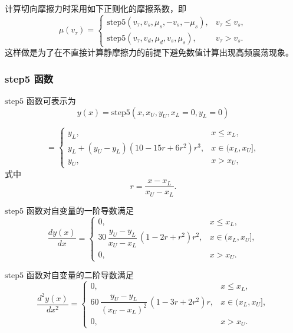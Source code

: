 计算切向摩擦力时采用如下正则化的摩擦系数，即
\begin{equation}\label{eq:11.74}
\mu(v_{\tau}) = \begin{cases}
\mathrm{step5}(v_{\tau}, v_s, \mu_s, -v_s, -\mu_s), & v_{\tau} \leq v_s, \\[4pt]
\mathrm{step5}(v_{\tau}, v_d, \mu_d, v_s, \mu_s), & v_{\tau} > v_s.
\end{cases}
\end{equation}
这样做是为了在不直接计算静摩擦力的前提下避免数值计算出现高频震荡现象。

\subsubsection{step5 函数}

$\mathrm{step5}$ 函数可表示为
\begin{equation}\label{eq:11.75}
y(x) = \mathrm{step5}(x, x_U, y_U, x_L = 0, y_L = 0)
\end{equation}

\begin{equation}\label{eq:11.76}
= \begin{cases}
y_L, & x \leq x_L, \\[6pt]
y_L + (y_U - y_L) (10 - 15r + 6r^2) r^3, & x \in (x_L, x_U], \\[6pt]
y_U, & x > x_U,
\end{cases}
\end{equation}
式中
\begin{equation}\label{eq:11.77}
r = \frac{x - x_L}{x_U - x_L}.
\end{equation}

$\mathrm{step5}$ 函数对自变量的一阶导数满足
\begin{equation}\label{eq:11.78}
\frac{dy(x)}{dx} = \begin{cases}
0, & x \leq x_L, \\[6pt]
30 \, \dfrac{y_U - y_L}{x_U - x_L} \, (1 - 2r + r^2) r^2, & x \in (x_L, x_U], \\[6pt]
0, & x > x_U.
\end{cases}
\end{equation}

$\mathrm{step5}$ 函数对自变量的二阶导数满足
\begin{equation}\label{eq:11.79}
\frac{d^2 y(x)}{dx^2} = \begin{cases}
0, & x \leq x_L, \\[6pt]
60 \, \dfrac{y_U - y_L}{(x_U - x_L)^2} \, (1 - 3r + 2r^2) r, & x \in (x_L, x_U], \\[6pt]
0, & x > x_U.
\end{cases}
\end{equation}

